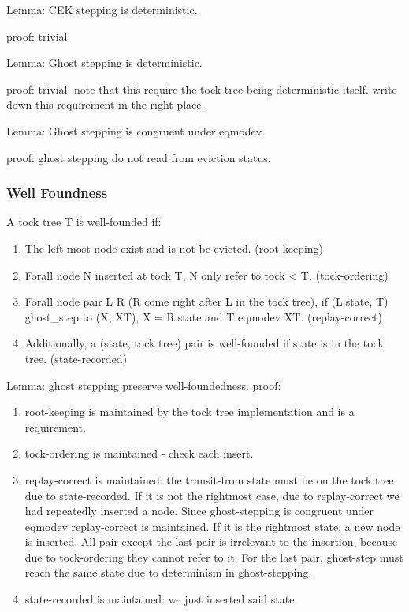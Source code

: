 Lemma: CEK stepping is deterministic.

proof: trivial.

Lemma: Ghost stepping is deterministic.

proof: trivial. note that this require the tock tree being deterministic itself. write down this requirement in the right place.

Lemma: Ghost stepping is congruent under eqmodev.

proof: ghost stepping do not read from eviction status.

\subsubsection{Well Foundness}
A tock tree T is well-founded  if:
\begin{enumerate}
	\item The left most node exist and is not be evicted. (root-keeping)
	\item Forall node N inserted at tock T, N only refer to tock < T. (tock-ordering)
	\item Forall node pair L R (R come right after L in the tock tree), if (L.state, T) ghost\_step to (X, XT), X = R.state and T eqmodev XT. (replay-correct)
	\item Additionally, a (state, tock tree) pair is well-founded if state is in the tock tree. (state-recorded)
\end{enumerate}

Lemma: ghost stepping preserve well-foundedness.
proof:
\begin{enumerate}
	\item root-keeping is maintained by the tock tree implementation and is a requirement.
	\item tock-ordering is maintained - check each insert.
	\item replay-correct is maintained: the transit-from state must be on the tock tree due to state-recorded. If it is not the rightmost case, due to replay-correct we had repeatedly inserted a node. Since ghost-stepping is congruent under eqmodev replay-correct is maintained. If it is the rightmost state, a new node is inserted. All pair except the last pair is irrelevant to the insertion, because due to tock-ordering they cannot refer to it. For the last pair, ghost-step must reach the same state due to determinism in ghost-stepping.
	\item state-recorded is maintained: we just inserted said state.
\end{enumerate}

